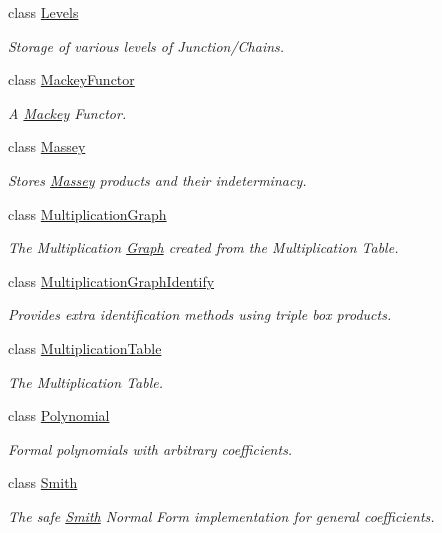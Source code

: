 \begin{DoxyCompactItemize}
class \hyperlink{classMackey_1_1Levels}{Levels}
\begin{DoxyCompactList}\small\item\em Storage of various levels of Junction/\+Chains. \end{DoxyCompactList}\item 
class \hyperlink{classMackey_1_1MackeyFunctor}{Mackey\+Functor}
\begin{DoxyCompactList}\small\item\em A \hyperlink{namespaceMackey}{Mackey} Functor. \end{DoxyCompactList}\item 
class \hyperlink{classMackey_1_1Massey}{Massey}
\begin{DoxyCompactList}\small\item\em Stores \hyperlink{classMackey_1_1Massey}{Massey} products and their indeterminacy. \end{DoxyCompactList}\item 
class \hyperlink{classMackey_1_1MultiplicationGraph}{Multiplication\+Graph}
\begin{DoxyCompactList}\small\item\em The Multiplication \hyperlink{classMackey_1_1Graph}{Graph} created from the Multiplication Table. \end{DoxyCompactList}\item 
class \hyperlink{classMackey_1_1MultiplicationGraphIdentify}{Multiplication\+Graph\+Identify}
\begin{DoxyCompactList}\small\item\em Provides extra identification methods using triple box products. \end{DoxyCompactList}\item 
class \hyperlink{classMackey_1_1MultiplicationTable}{Multiplication\+Table}
\begin{DoxyCompactList}\small\item\em The Multiplication Table. \end{DoxyCompactList}\item 
class \hyperlink{classMackey_1_1Polynomial}{Polynomial}
\begin{DoxyCompactList}\small\item\em Formal polynomials with arbitrary coefficients. \end{DoxyCompactList}\item 
class \hyperlink{classMackey_1_1Smith}{Smith}
\begin{DoxyCompactList}\small\item\em The safe \hyperlink{classMackey_1_1Smith}{Smith} Normal Form implementation for general coefficients. \end{DoxyCompactList}\item 

\end{DoxyCompactItemize}

